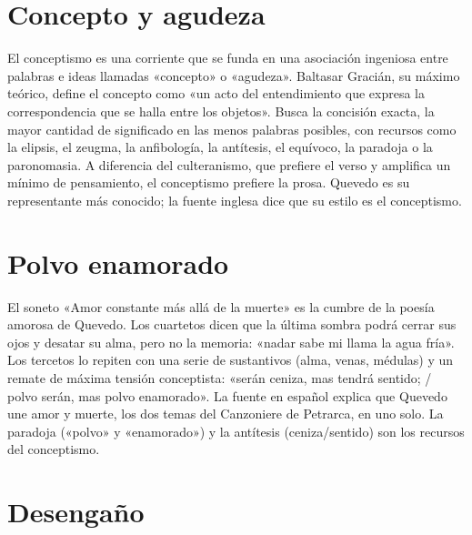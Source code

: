 \documentclass{book}
\begin{document}

\section{Concepto y agudeza}

El conceptismo es una corriente que se funda en una asociación ingeniosa entre palabras e ideas llamadas «concepto» o «agudeza». Baltasar Gracián, su máximo teórico, define el concepto como «un acto del entendimiento que expresa la correspondencia que se halla entre los objetos». Busca la concisión exacta, la mayor cantidad de significado en las menos palabras posibles, con recursos como la elipsis, el zeugma, la anfibología, la antítesis, el equívoco, la paradoja o la paronomasia. A diferencia del culteranismo, que prefiere el verso y amplifica un mínimo de pensamiento, el conceptismo prefiere la prosa. Quevedo es su representante más conocido; la fuente inglesa dice que su estilo es el conceptismo.


\section{Polvo enamorado}

El soneto «Amor constante más allá de la muerte» es la cumbre de la poesía amorosa de Quevedo. Los cuartetos dicen que la última sombra podrá cerrar sus ojos y desatar su alma, pero no la memoria: «nadar sabe mi llama la agua fría». Los tercetos lo repiten con una serie de sustantivos (alma, venas, médulas) y un remate de máxima tensión conceptista: «serán ceniza, mas tendrá sentido; / polvo serán, mas polvo enamorado». La fuente en español explica que Quevedo une amor y muerte, los dos temas del Canzoniere de Petrarca, en uno solo. La paradoja («polvo» y «enamorado») y la antítesis (ceniza/sentido) son los recursos del conceptismo.


\section{Desengaño}
\end{document}
